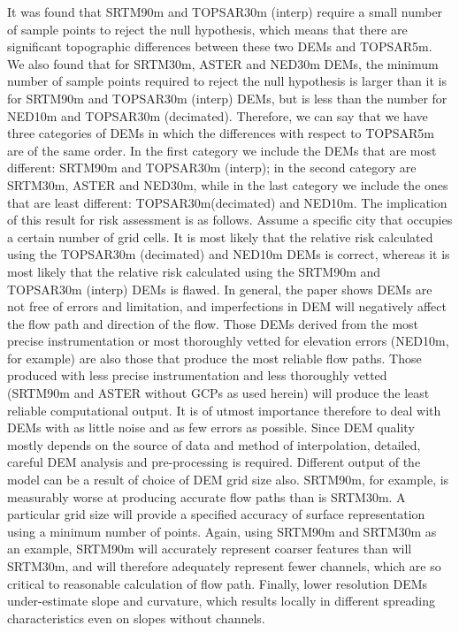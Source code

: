 \documentclass[12pt,letterpaper]{article}
\begin{document}
It was found that SRTM90m and TOPSAR30m (interp) require a small
number of sample points to reject the null hypothesis, which means
that there are significant topographic differences between these two
DEMs and TOPSAR5m.  We also found that for SRTM30m, ASTER and NED30m
DEMs, the minimum number of sample points required to reject the null
hypothesis is larger than it is for SRTM90m and TOPSAR30m (interp)
DEMs, but is less than the number for NED10m and TOPSAR30m
(decimated). Therefore, we can say that we have three categories of
DEMs in which the differences with respect to TOPSAR5m are of the same
order. In the first category we include the DEMs that are most
different: SRTM90m and TOPSAR30m (interp); in the second category are
SRTM30m, ASTER and NED30m, while in the last category we include the
ones that are least different: TOPSAR30m(decimated) and NED10m.  The
implication of this result for risk assessment is as follows.  Assume
a specific city that occupies a certain number of grid cells.
It is most likely that the relative risk calculated using the
TOPSAR30m (decimated) and NED10m DEMs is correct, whereas it is most
likely that the relative risk calculated using the SRTM90m and
TOPSAR30m (interp) DEMs is flawed.
In general, the paper shows DEMs are  not  free  of  errors  and  limitation, and 
imperfections in DEM will negatively affect the 
   flow path and direction of the flow.  Those DEMs derived from the most precise instrumentation or most thoroughly vetted for elevation errors (NED10m, for example) are also those that produce the most reliable flow paths.  Those produced with less precise instrumentation and less thoroughly vetted (SRTM90m and ASTER without GCPs as used herein) will produce the least reliable computational output.   It is of utmost importance therefore to 
deal with DEMs with as little noise and as few errors as possible. Since
DEM quality mostly depends on the source of data and method of interpolation, detailed, careful 
DEM analysis and pre-processing is required.
 Different output of the model can be a result of choice of DEM grid size also.  SRTM90m, for example, is measurably worse at producing accurate flow paths than is SRTM30m. 
A particular grid size will provide a specified accuracy of surface representation
using a minimum number of points.  Again, using SRTM90m and SRTM30m as an example, SRTM90m will accurately represent coarser features than will SRTM30m, and will therefore adequately represent fewer channels, which are so critical to reasonable calculation of flow path.
Finally,  lower resolution  DEMs  under-estimate slope and curvature,
which results locally in different spreading characteristics even on slopes without channels.
\end{document}
